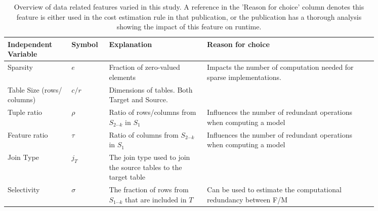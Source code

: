 \begingroup
\renewcommand{\arraystretch}{1.5}
\begin{table}[ht]
    \centering
    \begin{tabular}{p{0.15\linewidth}p{0.07\linewidth}p{0.23\linewidth}p{0.4\linewidth}}
        \toprule
        Independent Variable       & Symbol   & Explanation                                                        & Reason for choice                                                                                                                                          \\ \midrule \midrule
        Sparsity                   & $e$      & Fraction of zero-valued elements                                   & Impacts the number of computation needed for sparse implementations. \cite{MorpheusFIEnablingOptimizingNonlinear2019, morpheus, schijndel_cost_estimation} \\
        Table Size (rows/ columns) & $c/r$    & Dimensions of tables. Both Target and Source.                      & \cite{morpheus}                                                                                                                                            \\
        Tuple ratio                & $\rho$   & Ratio of rows/columns from $S_{2\cdots k}$ in $S_1$                & Influences the number of redundant operations when computing a model\cite{morpheus}                                                                        \\
        Feature ratio              & $\tau$   & Ratio of columns from $S_{2\cdots k}$ in $S_1$                     & Influences the number of redundant operations when computing a model\cite{morpheus}                                                                        \\
        Join Type                  & $j_T$    & The join type used to join the source tables to the target table   & \cite{schijndel_cost_estimation}                                                                                                                           \\
        Selectivity                & $\sigma$ & The fraction of rows from $S_{1\cdots k}$ that are included in $T$ & Can be used to estimate the computational redundancy between F/M \cite{MorpheusFIEnablingOptimizingNonlinear2019}                                          \\
        \bottomrule
    \end{tabular}
    \caption{Overview of data related features varied in this study. A reference in the 'Reason for choice' column denotes this feature is either used in the cost estimation rule in that publication, or the publication has a thorough analysis showing the impact of this feature on runtime.}
    \label{tab:4-data_chars}
\end{table}
\endgroup

